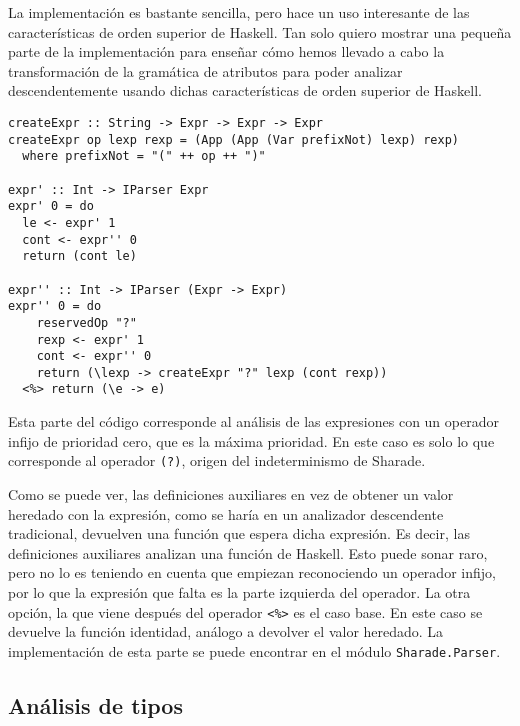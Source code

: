 \documentclass[class=article, crop=false]{standalone}
\begin{document}
La implementación es bastante sencilla, pero hace un uso interesante de las características
de orden superior de Haskell. Tan solo quiero mostrar una pequeña parte de la
implementación para enseñar cómo hemos llevado a cabo la transformación de la gramática de
atributos para poder analizar descendentemente usando dichas características de orden
superior de Haskell.

\begin{verbatim}
createExpr :: String -> Expr -> Expr -> Expr
createExpr op lexp rexp = (App (App (Var prefixNot) lexp) rexp)
  where prefixNot = "(" ++ op ++ ")"

expr' :: Int -> IParser Expr
expr' 0 = do
  le <- expr' 1
  cont <- expr'' 0
  return (cont le)

expr'' :: Int -> IParser (Expr -> Expr)
expr'' 0 = do
    reservedOp "?"
    rexp <- expr' 1
    cont <- expr'' 0
    return (\lexp -> createExpr "?" lexp (cont rexp))
  <%> return (\e -> e)
\end{verbatim}

Esta parte del código corresponde al análisis de las expresiones con un operador infijo de
prioridad cero, que es la máxima prioridad. En este caso es solo lo que corresponde al
operador \verb`(?)`, origen del indeterminismo de Sharade.

Como se puede ver, las definiciones auxiliares en vez de obtener un valor heredado con la
expresión, como se haría en un analizador descendente tradicional, devuelven una función que
espera dicha expresión. Es decir, las definiciones auxiliares analizan una función de
Haskell. Esto puede sonar raro, pero no lo es teniendo en cuenta que empiezan reconociendo un
operador infijo, por lo que la expresión que falta es la parte izquierda del operador. La
otra opción, la que viene después del operador \verb`<%>` es el caso base. En este caso se
devuelve la función identidad, análogo a devolver el valor heredado. La implementación de
esta parte se puede encontrar en el módulo \verb`Sharade.Parser`.

\subsection{Análisis de tipos}
\end{document}

